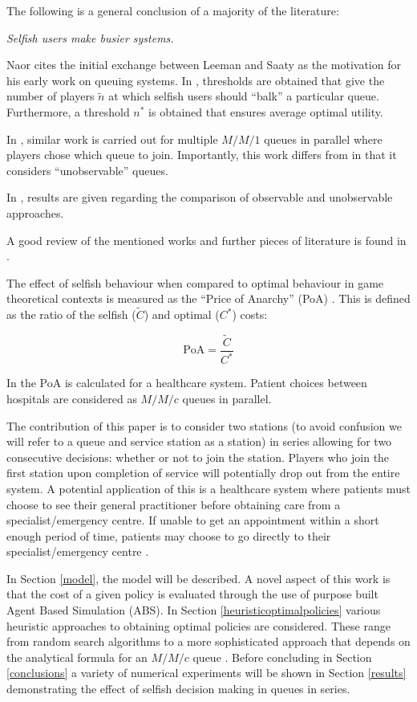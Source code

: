 \documentclass[12pt]{article}
\newcommand{\VK}[1]{\todo[color=blue!20]{#1}}
\newcommand{\PoA}{\text{PoA}}
\begin{document}
The following is a general conclusion of a majority of the literature:

\begin{center}
\textit{Selfish users make busier systems.}
\end{center}

Naor cites the initial exchange between Leeman and Saaty as the motivation for his early work on queuing systems.
In \cite{naor1969regulation}, thresholds are obtained that give the number of players $\tilde n$ at which selfish users should ``balk'' a particular queue.
Furthermore, a threshold $n^*$ is obtained that ensures average optimal utility.

In \cite{bell1983individual}, similar work is carried out for multiple $M/M/1$ queues in parallel where players chose which queue to join.
Importantly, this work differs from \cite{naor1969regulation} in that it considers ``unobservable'' queues.

In \cite{knight2012comparisons}, results are given regarding the comparison of observable and unobservable approaches.

A good review of the mentioned works and further pieces of literature is found in \cite{hassin2003queue}.

The effect of selfish behaviour when compared to optimal behaviour in game theoretical contexts is measured as the ``Price of Anarchy'' (PoA) \cite{koutsoupias2009worst, roughgarden2002bad}.
This is defined as the ratio of the selfish ($\tilde C$) and optimal ($C^*$) costs:

$$
\PoA = \frac{\tilde C}{C^*}
$$

In \cite{knight2013selfish} the PoA is calculated for a healthcare system.
Patient choices between hospitals are considered as $M/M/c$ queues in parallel.

The contribution of this paper is to consider two stations (to avoid confusion we will refer to a queue and service station as a station) in series allowing for two consecutive decisions: whether or not to join the station.
Players who join the first station upon completion of service will potentially drop out from the entire system.
A potential application of this is a healthcare system where patients must choose to see their general practitioner before obtaining care from a specialist/emergency centre.
If unable to get an appointment within a short enough period of time, patients may choose to go directly to their specialist/emergency centre \cite{Mail_millions}.

In Section \ref{model}, the model will be described.
\VK{Include something here about MC...}
A novel aspect of this work is that the cost of a given policy is evaluated through the use of purpose built Agent Based Simulation (ABS).
In Section \ref{heuristicoptimalpolicies} various heuristic approaches to obtaining optimal policies are considered.
These range from random search algorithms to a more sophisticated approach that depends on the analytical formula for an $M/M/c$ queue \cite{stewart2009probability}.
Before concluding in Section \ref{conclusions} a variety of numerical experiments will be shown in Section \ref{results} demonstrating the effect of selfish decision making in queues in series.
\end{document}
